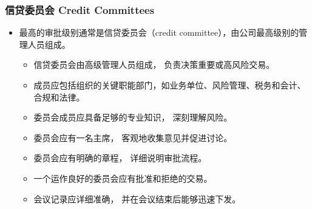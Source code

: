 \subsubsection{信贷委员会 Credit Committees}
    \begin{itemize}
        \item 最高的审批级别通常是信贷委员会（credit committee），由公司最高级别的管理人员组成。
        \begin{itemize}
            \item 信贷委员会由高级管理人员组成， 负责决策重要或高风险交易。
            \item  成员应包括组织的关键职能部门，如业务单位、风险管理、税务和会计、
            合规和法律。
            \item  委员会成员应具备足够的专业知识， 深刻理解风险。
            \item  委员会应有一名主席， 客观地收集意见并促进讨论。
            \item  委员会应有明确的章程， 详细说明审批流程。
            \item  一个运作良好的委员会应有批准和拒绝的交易。
            \item  会议记录应详细准确， 并在会议结束后能够迅速下发。
        \end{itemize}
    \end{itemize}
